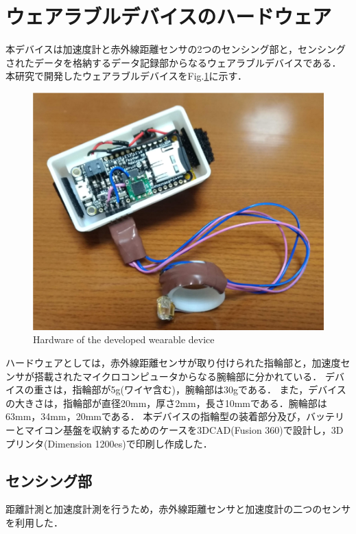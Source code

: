 \section{ウェアラブルデバイスのハードウェア}
本デバイスは加速度計と赤外線距離センサの2つのセンシング部と，センシングされたデータを格納するデータ記録部からなるウェアラブルデバイスである．
本研究で開発したウェアラブルデバイスをFig.\ref{fig:device}に示す．
\begin{figure}[H]
  \centering
  \includegraphics[width=0.8\linewidth]{fig/fal6}
  \caption{Hardware of the developed wearable device}
  \label{fig:device}
\end{figure}
ハードウェアとしては，赤外線距離センサが取り付けられた指輪部と，加速度センサが搭載されたマイクロコンピュータからなる腕輪部に分かれている．
デバイスの重さは，指輪部が5g(ワイヤ含む)，腕輪部は30gである．
また，デバイスの大きさは，指輪部が直径20mm，厚さ2mm，長さ10mmである．腕輪部は63mm，34mm，20mmである．
本デバイスの指輪型の装着部分及び，バッテリーとマイコン基盤を収納するためのケースを3DCAD(Fusion 360)で設計し，3Dプリンタ(Dimension 1200es)で印刷し作成した．


\subsection*{センシング部}
距離計測と加速度計測を行うため，赤外線距離センサと加速度計の二つのセンサを利用した．
